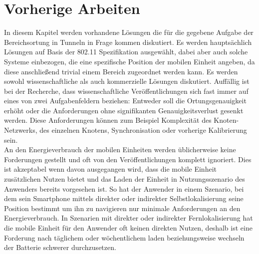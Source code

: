 
\chapter{Vorherige Arbeiten}
\label{ch:Vorherige}
In diesem Kapitel werden vorhandene Lösungen die für die gegebene Aufgabe der Bereichsortung in Tunneln in Frage kommen diskutiert. 
Es werden hauptsächlich Lösungen auf Basis der 802.11 Spezifikation ausgewählt, dabei aber auch solche Systeme einbezogen, die eine spezifische Position der mobilen Einheit angeben, da diese anschließend trivial einem Bereich zugeordnet werden kann. 
Es werden sowohl wissenschaftliche als auch kommerzielle Lösungen diskutiert.
Auffällig ist bei der Recherche, dass wissenschaftliche Veröffentlichungen sich fast immer auf eines von zwei Aufgabenfeldern beziehen: Entweder soll die Ortungsgenauigkeit erhöht oder die Anforderungen ohne signifikanten Genauigkeitsverlust gesenkt werden. 
Diese Anforderungen können zum Beispiel Komplexität des Knoten-Netzwerks, des einzelnen Knotens, Synchronisation oder vorherige Kalibrierung sein.\\
An den Energieverbrauch der mobilen Einheiten werden üblicherweise keine Forderungen gestellt und oft von den Veröffentlichungen komplett ignoriert.
Dies ist akzeptabel wenn davon ausgegangen wird, dass die mobile Einheit zusätzlichen Nutzen bietet und das Laden der Einheit in Nutzungsszenario des Anwenders bereits vorgesehen ist.
So hat der Anwender in einem Szenario, bei dem sein Smartphone mittels direkter oder indirekter Selbstlokalisierung seine Position bestimmt um ihn zu navigieren nur minimale Anforderungen an den Energieverbrauch.
In Szenarien mit direkter oder indirekter Fernlokalisierung hat die mobile Einheit für den Anwender oft keinen direkten Nutzen, deshalb ist eine Forderung nach täglichem oder wöchentlichem laden beziehungsweise wechseln der Batterie schwerer durchzusetzen.\\

